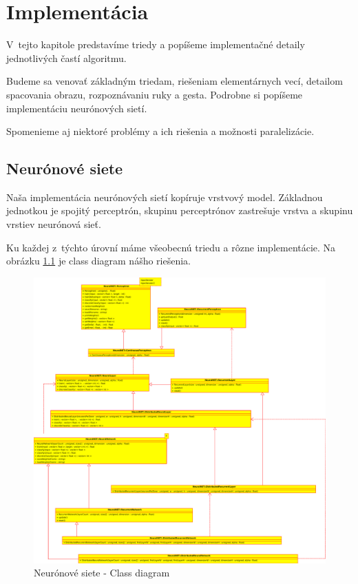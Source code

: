 \chapter{Implementácia}\label{chap:implementation}

V~tejto kapitole predstavíme triedy a popíšeme implementačné detaily jednotlivých častí algoritmu.

Budeme sa venovať základným triedam, riešeniam elementárnych vecí, detailom spacovania obrazu, rozpoznávaniu ruky a gesta. Podrobne si popíšeme implementáciu neurónových sietí.

Spomenieme aj niektoré problémy a ich riešenia a možnosti paralelizácie.

\bigskip

\section{Neurónové siete}

Naša implementácia neurónových sietí kopíruje vrstvový model. Základnou jednotkou je spojitý perceptrón, skupinu perceptrónov zastrešuje vrstva a skupinu vrstiev neurónová sieť. 

Ku každej z~týchto úrovní máme všeobecnú triedu a rôzne implementácie. Na obrázku \ref{fig:nnclsdiag} je class diagram nášho riešenia.

\begin{figure}[htp]
    \centering
    \includegraphics[width=\textwidth]{images/nn_class_diagram}
    \caption{Neurónové siete - Class diagram}
    \label{fig:nnclsdiag}
\end{figure}

